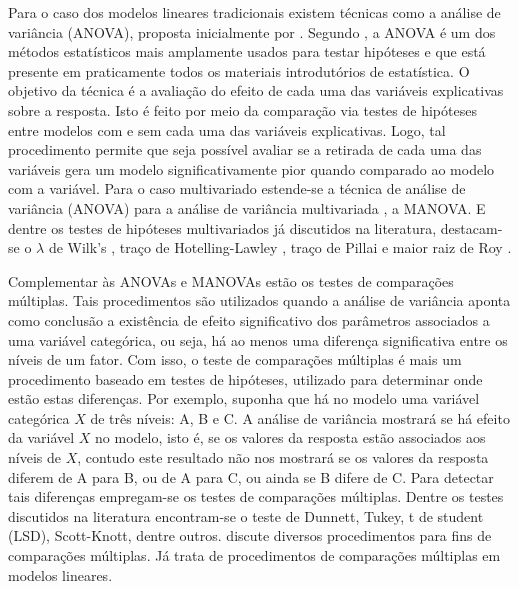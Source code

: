 \documentclass[AMA,STIX1COL]{WileyNJD-v2}
\begin{document}
Para o caso dos modelos lineares tradicionais existem técnicas como a análise de variância (ANOVA), proposta inicialmente por \cite{anova_fisher}. Segundo \cite{anova1}, a ANOVA é um dos métodos estatísticos mais amplamente usados para testar hipóteses e que está presente em praticamente todos os materiais introdutórios de estatística. O objetivo da técnica é a avaliação do efeito de cada uma das variáveis explicativas sobre a resposta. Isto é feito por meio da comparação via testes de hipóteses entre modelos com e sem cada uma das variáveis explicativas. Logo, tal procedimento permite que seja possível avaliar se a retirada de cada uma das variáveis gera um modelo significativamente pior quando comparado ao modelo com a variável. Para o caso multivariado estende-se a técnica de análise de variância (ANOVA) para a análise de variância  multivariada \citep{manova}, a MANOVA. E dentre os testes de hipóteses multivariados já discutidos na literatura, destacam-se o $\lambda$ de Wilk's \cite{wilks}, traço de Hotelling-Lawley \cite{lawley,hotelling}, traço de Pillai \cite{pillai} e maior raiz de Roy \cite{roy}. 


Complementar às ANOVAs e MANOVAs estão os testes de comparações múltiplas. Tais procedimentos são utilizados quando a análise de variância aponta como conclusão a existência de efeito significativo dos parâmetros associados a uma variável categórica, ou seja, há ao menos uma diferença significativa entre os níveis de um fator. Com isso, o teste de comparações múltiplas é mais um procedimento baseado em testes de hipóteses, utilizado para determinar onde estão estas diferenças. Por exemplo, suponha que há no modelo uma variável categórica $X$ de três níveis: A, B e C. A análise de variância mostrará se há efeito da variável $X$ no modelo, isto é, se os valores da resposta estão associados aos níveis de $X$, contudo este resultado não nos mostrará se os valores da resposta diferem de A para B, ou de A para C, ou ainda se B difere de C. Para detectar tais diferenças empregam-se os testes de comparações múltiplas. Dentre os testes discutidos na literatura encontram-se o teste de Dunnett, Tukey, t de student (LSD), Scott-Knott, dentre outros. \cite{hsu1996multiple} discute diversos procedimentos para fins de comparações múltiplas. Já \cite{bretz2008multiple} trata de procedimentos de comparações múltiplas em modelos lineares.
\end{document}
